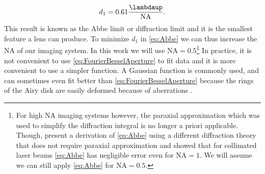 \begin{equation}\label{eq:Abbe}
    d_1 = 0.61 \frac{\lambdaup}{\text{NA}}.
\end{equation}
This result is known as the Abbe limit or diffraction limit \cite{Abbe1882} and it is the smallest feature a lens can produce.
To minimize $d_1$ in \cref{eq:Abbe} we can thus increase the \ac{NA} of our imaging system. 
In this work we will use $\text{NA} = 0.5$\footnote{For high NA imaging systems however, the paraxial approximation which was used to simplify the diffraction integral is no longer a priori applicable. 
Though, \cite{Chon2007} present a derivation of \cref{eq:Abbe} using a different diffraction theory that does not require paraxial approximation and showed that for collimated laser beams \cref{eq:Abbe} has negligible error even for $\text{NA} = 1$. 
We will assume we can still apply \cref{eq:Abbe} for $\text{NA} = 0.5$.}
In practice, it is not convenient to use \cref{eq:FourierBesselAperture} to fit data and it is more convenient to use a simpler function. 
A Gaussian function is commonly used, and can sometimes even fit better than \cref{eq:FourierBesselAperture} because the rings of the Airy disk are easily deformed because of aberrations \cite{Knottnerus2018}. 

